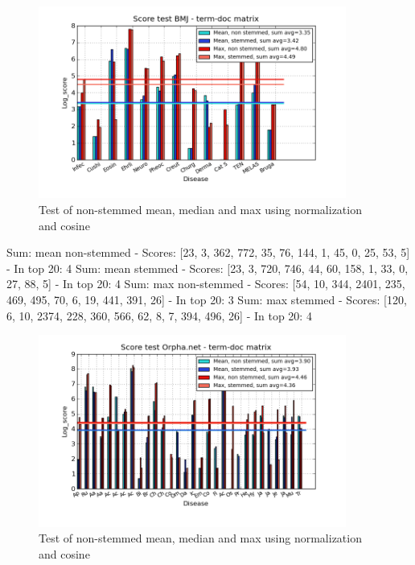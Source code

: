 \begin{figure}[h!]
        \begin{center}
          \includegraphics[width=0.9\textwidth]{barcharts/termDoc_bmj_hist_3000_ns_s_mea_max_sum.png}
        \end{center}
        \caption{Test of non-stemmed mean, median and max using normalization and cosine}
        \label{termDoc_bmj_hist_3000_ns_s_mea_max_sum}
\end{figure} 

Sum: mean non-stemmed - Scores: [23, 3, 362, 772, 35, 76, 144, 1, 45, 0, 25, 53, 5] - In top 20: 4
Sum: mean stemmed - Scores: [23, 3, 720, 746, 44, 60, 158, 1, 33, 0, 27, 88, 5] - In top 20: 4
Sum: max non-stemmed - Scores: [54, 10, 344, 2401, 235, 469, 495, 70, 6, 19, 441, 391, 26] - In top 20: 3
Sum: max stemmed - Scores: [120, 6, 10, 2374, 228, 360, 566, 62, 8, 7, 394, 496, 26] - In top 20: 4

\begin{figure}[h!]
        \begin{center}
          \includegraphics[width=0.9\textwidth]{barcharts/termDoc_orphan_hist_3000_ns_s_mea_max_sum.png}
        \end{center}
        \caption{Test of non-stemmed mean, median and max using normalization and cosine}
        \label{termDoc_orphan_hist_3000_ns_s_mea_max_sum}
\end{figure} 
 
